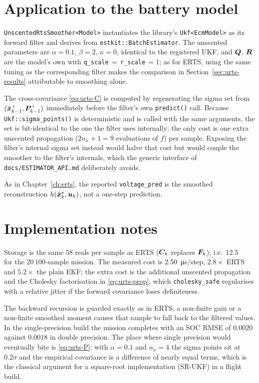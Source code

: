 \section{Application to the battery model}
\texttt{UnscentedRtsSmoother<Model>} instantiates the library's \texttt{Ukf<EcmModel>} as its
forward filter and derives from \texttt{estkit::BatchEstimator}.  The unscented parameters are
$\alpha=0.1$, $\beta=2$, $\kappa=0$, identical to the registered UKF, and $\bm{Q}$, $\bm{R}$ are the
model's own with \texttt{q\_scale}\,$=$\,\texttt{r\_scale}\,$=1$; as for ERTS, using the same tuning
as the corresponding filter makes the comparison in Section~\ref{sec:urts-results} attributable to
smoothing alone.

The cross-covariance \eqref{eq:urts-C} is computed by regenerating the sigma set from
$(\hat{\bm{x}}^{+}_{k-1},\bm{P}^+_{k-1})$ immediately before the filter's own \texttt{predict()} call.  Because
\texttt{Ukf::sigma\_points()} is deterministic and is called with the same arguments, the set is
bit-identical to the one the filter uses internally; the only cost is one extra unscented
propagation ($2n_x+1=9$ evaluations of $f$) per sample.  Exposing the filter's internal sigma set
instead would halve that cost but would couple the smoother to the filter's internals, which the
generic interface of \texttt{docs/ESTIMATOR\_API.md} deliberately avoids.

As in Chapter~\ref{ch:erts}, the reported \texttt{voltage\_pred} is the smoothed reconstruction
$h(\hat{\bm{x}}^s_k,\bm{u}_k)$, not a one-step prediction.

\section{Implementation notes}
Storage is the same $58$ reals per sample as ERTS ($\bm{C}_k$ replaces $\bm{F}_k$), i.e.\
\SI{12.5}{\mega\byte} for the $20\,100$-sample mission.  The measured cost is
\SI{2.50}{\micro\second}/step, $2.8\times$ ERTS and $5.2\times$ the plain EKF; the extra
cost is the additional unscented propagation and the Cholesky factorisation in
\eqref{eq:urts-prop}, which \texttt{cholesky\_safe} regularises with a relative jitter if the
forward covariance loses definiteness.

The backward recursion is guarded exactly as in ERTS: a non-finite gain or a non-finite smoothed
moment causes that sample to fall back to the filtered values.  In the single-precision build the
mission completes with an SOC RMSE of $0.0020$ against $0.0018$ in double precision.  The place
where single precision would eventually bite is \eqref{eq:urts-P}: with $\alpha=0.1$ and $n_x=4$ the
sigma points sit at $0.2\sigma$ and the empirical covariance is a difference of nearly equal terms,
which is the classical argument for a square-root implementation (SR-UKF) in a flight build.


